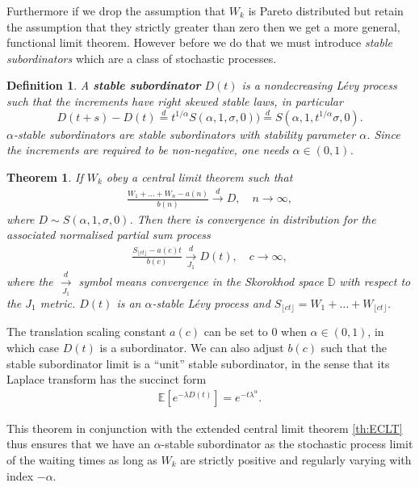 \documentclass[honours,12pt,twoside, openright]{unswthesis}
\newcommand{\E}{\mathbb{E}}
\newcommand{\1}{\mathbf 1}
\newcommand{\Floor}[1]{{\lfloor {#1} \rfloor}}
\newcommand{\D}{\mathbb{D}}
\newcommand{\cdj}{\overset{d}{\underset{J_1}{\longrightarrow}}}
\newtheorem{theorem}[equation]{Theorem}
\newtheorem{definition}[equation]{Definition}
\numberwithin{equation}{section}
\theoremstyle{definition}
\theoremstyle{remark}
\begin{document}
Furthermore if we drop the assumption that $W_k$ is Pareto distributed but retain the assumption that they strictly greater than zero then we get a more general, functional limit theorem. However before we do that we must introduce \emph{stable subordinators} which are a class of stochastic processes.
\begin{definition}
A \textbf{stable subordinator} $D(t)$ is a nondecreasing L\'{e}vy process such that the increments have right skewed stable laws, in particular
\[
	D(t+s)-D(t)\overset{d}{=}t^{1/\alpha}S(\alpha,1,\sigma,0))\overset{d}{=}S(\alpha,1,t^{1/\alpha}\sigma,0).
\]
$\alpha$-stable subordinators are stable subordinators with stability parameter $\alpha$.
Since the increments are required to be non-negative, one needs $\alpha \in (0,1)$. 
\end{definition}
\begin{theorem}\cite[Th.~4.5.3]{Whitt2010}\label{th:sfclt} If $W_k$ obey a central limit theorem such that
\begin{align}\label{eq:sclt}
	\frac{W_1 + \ldots + W_n - a(n)}{b(n)} \overset{d}{\longrightarrow} D, \quad n \to \infty,
\end{align}
where $D\sim S(\alpha,1,\sigma,0)$. Then there is convergence in distribution for the associated normalised partial sum process
\begin{align}
\frac{S_\Floor{ct} - a(c)t}{b(c)} \cdj D(t), \quad c \to \infty,
\end{align}
where the $\cdj$ symbol means convergence in the Skorokhod space $\D$ with respect to the $J_1$ metric. $D(t)$ is an 
$\alpha$-stable L\'evy process and $S_\Floor{ct}=W_1 + \ldots + W_\Floor{ct}$.
\end{theorem}

The translation scaling constant $a(c)$ can be set to $0$ when $\alpha\in(0,1)$,
in which case $D(t)$ is a subordinator. We can also adjust $b(c)$ such that the stable subordinator limit is a ``unit'' stable subordinator, in the sense that its Laplace transform has the succinct form
\begin{align}\label{eq:unitStable}
\E[e^{-\lambda D(t)}] = e^{-t \lambda^\alpha}.
\end{align}

This theorem in conjunction with the extended central limit theorem \ref{th:ECLT} thus ensures that we have an $\alpha$-stable subordinator as the stochastic process limit of the waiting times as long as $W_k$ are strictly positive and regularly varying with index $-\alpha$.
\end{document}

